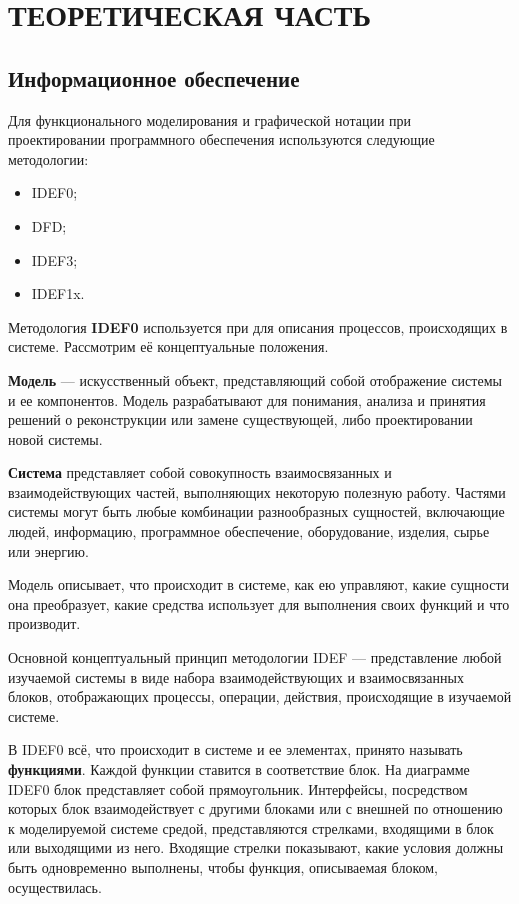 \section[Теоретическая часть]{ТЕОРЕТИЧЕСКАЯ ЧАСТЬ}

\subsection{Информационное обеспечение}

Для функционального моделирования и графической нотации при проектировании
программного обеспечения используются следующие методологии:
\begin{itemize}
\item IDEF0;
\item DFD;
\item IDEF3;
\item IDEF1x.
\end{itemize}

Методология \textbf{IDEF0} используется при для описания процессов,
происходящих в системе. Рассмотрим её концептуальные положения.

\textbf{Модель} --- искусственный объект, представляющий собой отображение
системы и ее компонентов. Модель разрабатывают для понимания, анализа и принятия
решений о реконструкции или замене существующей, либо
проектировании новой системы.

\textbf{Система} представляет собой совокупность
взаимосвязанных и взаимодействующих частей, выполняющих некоторую
полезную работу. Частями системы могут быть любые
комбинации разнообразных сущностей, включающие людей, информацию,
программное обеспечение, оборудование, изделия, сырье или энергию.

Модель описывает, что происходит в системе, как ею
управляют, какие сущности она преобразует, какие средства использует для
выполнения своих функций и что производит.

Основной концептуальный принцип методологии IDEF --- представление любой
изучаемой системы в виде набора взаимодействующих и взаимосвязанных
блоков, отображающих процессы, операции, действия,
происходящие в изучаемой системе.

В IDEF0 всё, что происходит в системе и ее элементах, принято называть
\textbf{функциями}. Каждой функции ставится в соответствие блок.
На диаграмме IDEF0 блок представляет собой прямоугольник.
Интерфейсы, посредством которых блок взаимодействует с другими блоками
или с внешней по отношению к моделируемой системе средой,
представляются стрелками, входящими в блок или выходящими из него.
Входящие стрелки показывают, какие условия должны быть одновременно
выполнены, чтобы функция, описываемая блоком, осуществилась.

